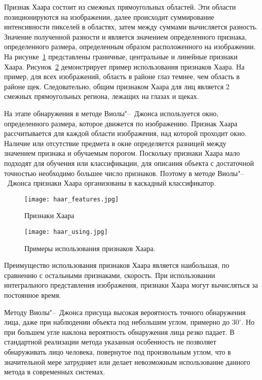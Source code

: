 Признак Хаара состоит из смежных прямоугольных областей. Эти области позиционируются на изображении, далее происходит суммирование интенсивности пикселей в областях, затем между суммами вычисляется разность. Значение полученной разности и является значением определенного признака, определенного размера, определенным образом расположенного на изображении. На рисунке~\ref{fig:haar_features} представлены граничные, центральные и линейные признаки Хаара. Рисунок~\ref{fig:haar_using} демонстрирует пример использования признаков Хаара. На пример, для всех изображений, область в районе глаз темнее, чем область в районе щек. Следовательно, общим признаком Хаара для лиц является 2 смежных прямоугольных региона, лежащих на глазах и щеках.

На этапе обнаружения в методе Виолы"--~Джонса используется окно, определенного размера, которое движется по изображению. Признак Хаара рассчитывается для каждой области изображения, над которой проходит окно. Наличие или отсутствие предмета в окне определяется разницей между значением признака и обучаемым порогом. Поскольку признаки Хаара мало подходят для обучения или классификации, для описания объекта с достаточной точностью необходимо большее число признаков. Поэтому в методе Виолы"--~Джонса признаки Хаара организованы в каскадный классификатор.

\begin{figure}[ht]
\centering
    \centering
    \texttt{[image: haar\_features.jpg]}  
  \caption{Признаки Хаара}
  \label{fig:haar_features}
\end{figure}
\begin{figure}[ht]
\centering
    \centering
    \texttt{[image: haar\_using.jpg]}  
  \caption{Примеры использования признаков Хаара.}
  \label{fig:haar_using}
\end{figure}

Преимущество использования признаков Хаара является наибольшая, по сравнению с остальными признаками, скорость. При использовании интегрального представления изображения, признаки Хаара могут вычисляться за постоянное время.

Методу Виолы"--~Джонса присуща высокая вероятность точного обнаружения лица, даже при наблюдении объекта под небольшим углом, примерно до $30^\circ$. Но при большем угле наклона вероятность обнаружения лица резко падает. В стандартной реализации метода указанная особенность не позволяет обнаруживать лицо человека, повернутое под произвольным углом, что в значительной мере затрудняет или делает невозможным использование данного метода в современных системах.

